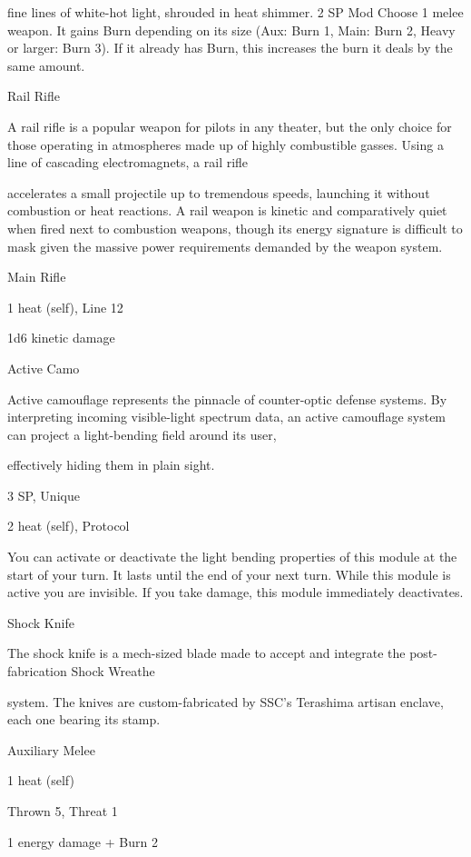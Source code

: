 fine lines of white-hot light, shrouded in heat shimmer.
2 SP
Mod
Choose 1 melee weapon. It gains Burn depending on its size (Aux: Burn 1, Main: Burn 2, Heavy
or larger: Burn 3). If it already has Burn, this increases the burn it deals by the same amount.


Rail Rifle

A rail rifle is a popular weapon for pilots in any theater, but the only choice for those operating in
atmospheres made up of highly combustible gasses. Using a line of cascading electromagnets, a rail rifle

accelerates a small projectile up to tremendous speeds, launching it without combustion or heat reactions.
A rail weapon is kinetic and comparatively quiet when fired next to combustion weapons, though its energy
signature is difficult to mask given the massive power requirements demanded by the weapon system.

Main Rifle

1 heat (self), Line 12

1d6 kinetic damage


Active Camo

Active camouflage represents the pinnacle of counter-optic defense systems. By interpreting incoming
visible-light spectrum data, an active camouflage system can project a light-bending field around its user,

effectively hiding them in plain sight.

3 SP, Unique

2 heat (self), Protocol





You can activate or deactivate the light bending properties of this module at the start of your
turn. It lasts until the end of your next turn. While this module is active you are invisible. If you
take damage, this module immediately deactivates.


Shock Knife

The shock knife is a mech-sized blade made to accept and integrate the post-fabrication Shock Wreathe

system. The knives are custom-fabricated by SSC’s Terashima artisan enclave, each one bearing its stamp.

Auxiliary Melee

1 heat (self)

Thrown 5, Threat 1

1 energy damage + Burn 2

